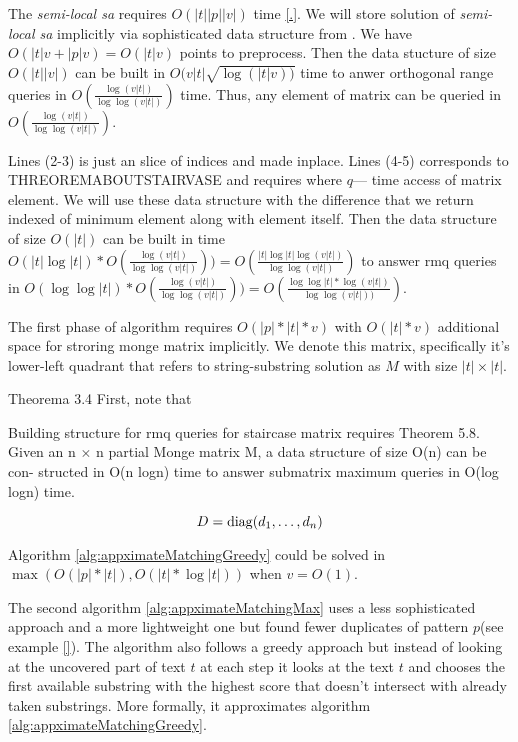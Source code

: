 The \emph{semi-local sa} requires $O(|t||p||v|)$ time \ref{.}.
We will store solution of \emph{semi-local sa} implicitly via sophisticated data structure from \cite{}.
We have $O(|t|v+|p|v) = O(|t|v)$ points to preprocess.
Then the data stucture of size $O(|t||v|)$ can be built in
$O(v|t|  \sqrt{\log(|t|v))}$ time to anwer orthogonal range queries in $O(\frac{\log (v|t|)}{\log \log (v|t|)})$ time.
Thus, any element of matrix can be queried in
$O(\frac{\log (v|t|)}{\log \log (v|t|)})$.   

Lines (2-3) is just an slice of indices and  made inplace.
Lines (4-5) corresponds to THREOREMABOUTSTAIRVASE and requires 
where $q$--- time access of matrix element.
We will use these data structure with the difference that we return indexed of  minimum element along with element itself. 
Then the data structure of size $O(|t|)$ can be built in time $O(|t|\log |t|) * O(\frac{\log (v|t|)}{\log \log (v|t|)}))=
O(\frac{|t|\log |t| \log (v|t|)}{\log \log (v|t|)})
$ to answer
rmq queries in $O(\log \log |t|)*O(\frac{\log (v|t|)}{\log \log (v|t|)}))=O(\frac{\log \log |t| * \log (v|t|)}{\log \log (v|t|))})$.


The first phase of algorithm requires $O(|p| * |t| * v)$ with $O(|t| * v)$ additional space for stroring monge matrix implicitly.
We denote this matrix, specifically it's lower-left quadrant that refers to
string-substring solution as $M$ with size $|t| \times |t|$.


  Theorema 3.4
First, note that 

Building structure for rmq queries for staircase matrix requires 
Theorem 5.8. Given an n $\times$ n partial Monge matrix M, a data structure of size O(n) can be con-
structed in O(n logn) time to answer submatrix maximum queries in O(log logn) time.
   

\begin{displaymath}
    D = \operatorname{diag}(d_1,\dots,d_n)
  \end{displaymath}


\begin{corollary}
Algorithm \ref{alg:appximateMatchingGreedy} could  be solved in 
$\max ( O(|p| * |t|), O(|t| * \log |t|))$ when $v = O(1)$.

\end{corollary}




The second algorithm \ref{alg:appximateMatchingMax} uses a less sophisticated approach and a more lightweight one but found fewer duplicates of pattern $p$(see example \ref{}).
The algorithm also follows a greedy approach but instead of looking at the uncovered part of text $t$ at each step it looks at the text $t$ and chooses the first available substring with the highest score that doesn't intersect with already taken substrings.
More formally, it approximates algorithm \ref{alg:appximateMatchingGreedy}.

